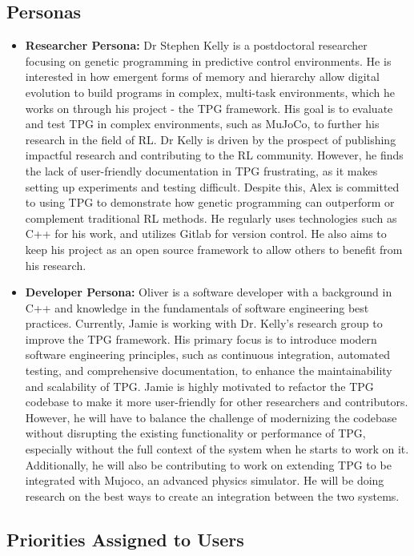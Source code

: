 \documentclass[12pt]{article}
\begin{document}
\subsection{Personas}
\begin{itemize}
  \item \textbf{Researcher Persona:}   Dr Stephen Kelly is a postdoctoral researcher focusing on genetic programming in predictive control environments. He is interested in how emergent forms of memory and hierarchy allow digital evolution to build programs in complex, multi-task environments, which he works on through his project -  the TPG framework. His goal is to evaluate and test TPG in complex environments, such as MuJoCo, to further his research in the field of RL. Dr Kelly is driven by the prospect of publishing impactful research and contributing to the RL community. However, he finds the lack of user-friendly documentation in TPG frustrating, as it makes setting up experiments and testing difficult. Despite this, Alex is committed to using TPG to demonstrate how genetic programming can outperform or complement traditional RL methods. He regularly uses technologies such as C++ for his work, and utilizes Gitlab for version control. He also aims to keep his project as an open source framework to allow others to benefit from his research.

  \item \textbf{Developer Persona:} Oliver is a software developer with a background in C++ and knowledge in the fundamentals of software engineering best practices. Currently, Jamie is working with Dr. Kelly’s research group to improve the TPG framework. His primary focus is to introduce modern software engineering principles, such as continuous integration, automated testing, and comprehensive documentation, to enhance the maintainability and scalability of TPG. Jamie is highly motivated to refactor the TPG codebase to make it more user-friendly for other researchers and contributors. However, he will have to balance the challenge of modernizing the codebase without disrupting the existing functionality or performance of TPG, especially without the full context of the system when he starts to work on it. Additionally, he will also be contributing to work on extending TPG to be integrated with Mujoco, an advanced physics simulator. He will be doing research on the best ways to create an integration between the two systems.

  \end{itemize}
\subsection{Priorities Assigned to Users}
\end{document}
